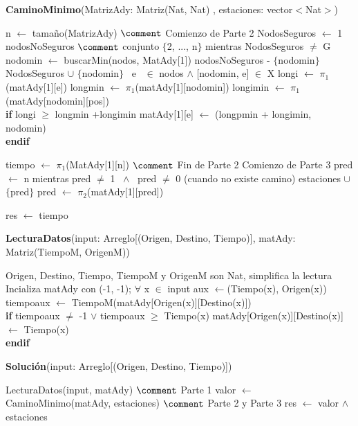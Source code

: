 \documentclass[spanish,12pt]{article}
\begin{document}
\begin{algorithm}[H]{\textbf{CaminoMinimo}(MatrizAdy: Matriz(Nat, Nat) , estaciones: vector$<$Nat$>$)}
	\begin{algorithmic}[1]

		\State n $\gets$ tamaño(MatrizAdy) $\comment$ Comienzo de Parte 2
		\State NodosSeguros $\gets$ 1
		\State nodosNoSeguros $\comment$ conjunto $\{$2, ..., n$\}$
		\State mientras NodosSeguros $\neq$ G
		\State \quad nodomin $\gets$ buscarMin(nodos, MatAdy[1])
		\State \quad nodosNoSeguros - $\{$nodomin$\}$
		\State \quad NodosSeguros $\cup$ $\{$nodomin$\}$
		\State \quad \forall \ e \ $\in$ nodos $\land$ [nodomin, e] $\in$ X
		\State \qquad longi $\gets$ $\pi_{1}$(matAdy[1][e])
		\State \qquad longmin $\gets$ $\pi_{1}$(matAdy[1][nodomin])
		\State \qquad longimin $\gets$ $\pi_{1}$(matAdy[nodomin][pos])
\\
		\qquad \textbf{if} longi $\geq$ longmin +longimin
			\State \qquad \quad matAdy[1][e] $\gets$ (longpmin + longimin, nodomin)
\\
 \qquad \textbf{endif}

		\State tiempo $\gets$ $\pi_{1}$(MatAdy[1][n]) $\comment$ Fin de Parte 2 Comienzo de Parte 3
		\State pred $\gets$ n
		\State mientras pred $\neq$ 1 \ $\land$ \ pred $\neq$ 0 (cuando no existe camino)
		\State \quad estaciones $\cup$ $\{$pred$\}$
		\State \quad pred $\gets$ $\pi_{2}$(matAdy[1][pred])

		\State res $\gets$ tiempo
 	\end{algorithmic}
\end{algorithm}

\begin{algorithm}[H]{\textbf{LecturaDatos}(input: Arreglo[(Origen, Destino, Tiempo)], matAdy: Matriz(TiempoM, OrigenM))}
	\begin{algorithmic}[1]
		\State Origen, Destino, Tiempo, TiempoM y OrigenM son Nat, simplifica la lectura
		\State Incializa matAdy con (-1, -1);
		\State $\forall$ x $\in$ input
		\State \quad aux $\gets$(Tiempo(x), Origen(x))
		\State \quad tiempoaux $\gets$ TiempoM(matAdy[Origen(x)][Destino(x)])
\\
		\qquad \textbf{if} tiempoaux $\neq$ -1 $\vee$ tiempoaux $\geq$ Tiempo(x)
			\State \qquad \quad matAdy[Origen(x)][Destino(x)] $\gets$ Tiempo(x)
\\
 \qquad \textbf{endif}
	\end{algorithmic}
\end{algorithm}

\begin{algorithm}[H]{\textbf{Solución}(input: Arreglo[(Origen, Destino, Tiempo)])}
	\begin{algorithmic}[1]
		\State LecturaDatos(input, matAdy) $\comment$ Parte 1
		\State valor $\gets$ CaminoMinimo(matAdy, estaciones) $\comment$ Parte 2 y Parte 3
		\State res $\gets$ valor $\land$ estaciones
	\end{algorithmic}
\end{algorithm}
\end{document}
